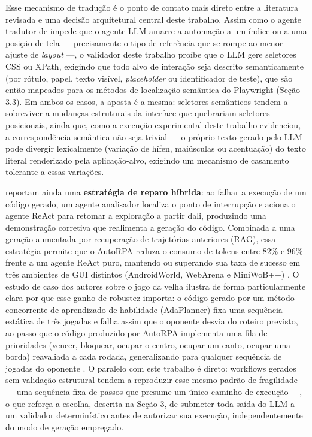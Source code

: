 \documentclass[
	article,
	12pt,
	oneside,
	a4paper,
	section=TITLE,
	english,
	brazil,
	sumario=tradicional
	]{abntex2}
\begin{document}
Esse mecanismo de tradução é o ponto de contato mais direto entre a
literatura revisada e uma decisão arquitetural central deste trabalho.
Assim como o agente tradutor de  impede que o
agente LLM amarre a automação a um índice ou a uma posição de tela ---
precisamente o tipo de referência que se rompe ao menor ajuste de
\textit{layout} ---, o validador deste trabalho proíbe que o LLM gere
seletores CSS ou XPath, exigindo que todo alvo de interação seja descrito
semanticamente (por rótulo, papel, texto visível, \textit{placeholder}
ou identificador de teste), que são então mapeados para os métodos de
localização semântica do Playwright (Seção 3.3). Em ambos os casos, a
aposta é a mesma: seletores semânticos tendem a sobreviver a mudanças
estruturais da interface que quebrariam seletores posicionais, ainda que,
como a execução experimental deste trabalho evidenciou, a correspondência
semântica não seja trivial --- o próprio texto gerado pelo LLM pode
divergir lexicalmente (variação de hífen, maiúsculas ou acentuação) do
texto literal renderizado pela aplicação-alvo, exigindo um mecanismo de
casamento tolerante a essas variações.

 reportam ainda uma \textbf{estratégia de reparo
híbrida}: ao falhar a execução de um código gerado, um agente analisador
localiza o ponto de interrupção e aciona o agente ReAct para retomar a
exploração a partir dali, produzindo uma demonstração corretiva que
realimenta a geração do código. Combinada a uma geração aumentada por
recuperação de trajetórias anteriores (RAG), essa estratégia permite que
o AutoRPA reduza o consumo de tokens entre 82\% e 96\% frente a um agente
ReAct puro, mantendo ou superando sua taxa de sucesso em três ambientes
de GUI distintos (AndroidWorld, WebArena e MiniWoB++)
\cite{chen2026}. O estudo de caso dos autores sobre o jogo da velha
ilustra de forma particularmente clara por que esse ganho de robustez
importa: o código gerado por um método concorrente de aprendizado de
habilidade (AdaPlanner) fixa uma sequência estática de três jogadas e
falha assim que o oponente desvia do roteiro previsto, ao passo que o
código produzido por AutoRPA implementa uma fila de prioridades (vencer,
bloquear, ocupar o centro, ocupar um canto, ocupar uma borda) reavaliada
a cada rodada, generalizando para qualquer sequência de jogadas do
oponente \cite{chen2026}. O paralelo com este trabalho é direto: workflows
gerados sem validação estrutural tendem a reproduzir esse mesmo padrão de
fragilidade --- uma sequência fixa de passos que presume um único
caminho de execução ---, o que reforça a escolha, descrita na Seção 3,
de submeter toda saída do LLM a um validador determinístico antes de
autorizar sua execução, independentemente do modo de geração empregado.
\end{document}
